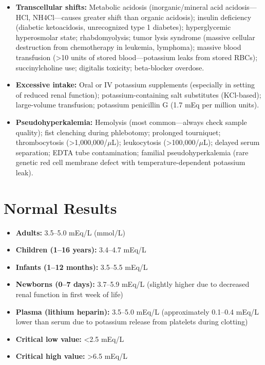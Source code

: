 \begin{itemize}
  \item \textbf{Transcellular shifts:} Metabolic acidosis (inorganic/mineral acid acidosis---HCl, NH4Cl---causes greater shift than organic acidosis); insulin deficiency (diabetic ketoacidosis, unrecognized type 1 diabetes); hyperglycemic hyperosmolar state; rhabdomyolysis; tumor lysis syndrome (massive cellular destruction from chemotherapy in leukemia, lymphoma); massive blood transfusion (>10 units of stored blood---potassium leaks from stored RBCs); succinylcholine use; digitalis toxicity; beta-blocker overdose.
  \item \textbf{Excessive intake:} Oral or IV potassium supplements (especially in setting of reduced renal function); potassium-containing salt substitutes (KCl-based); large-volume transfusion; potassium penicillin G (1.7 mEq per million units).
  \item \textbf{Pseudohyperkalemia:} Hemolysis (most common---always check sample quality); fist clenching during phlebotomy; prolonged tourniquet; thrombocytosis (>1,000,000/$\mu$L); leukocytosis (>100,000/$\mu$L); delayed serum separation; EDTA tube contamination; familial pseudohyperkalemia (rare genetic red cell membrane defect with temperature-dependent potassium leak).
\end{itemize}

\section*{Normal Results}
\begin{itemize}
  \item \textbf{Adults:} 3.5--5.0 mEq/L (mmol/L)
  \item \textbf{Children (1--16 years):} 3.4--4.7 mEq/L
  \item \textbf{Infants (1--12 months):} 3.5--5.5 mEq/L
  \item \textbf{Newborns (0--7 days):} 3.7--5.9 mEq/L (slightly higher due to decreased renal function in first week of life)
  \item \textbf{Plasma (lithium heparin):} 3.5--5.0 mEq/L (approximately 0.1--0.4 mEq/L lower than serum due to potassium release from platelets during clotting)
  \item \textbf{Critical low value:} <2.5 mEq/L
  \item \textbf{Critical high value:} >6.5 mEq/L
\end{itemize}

